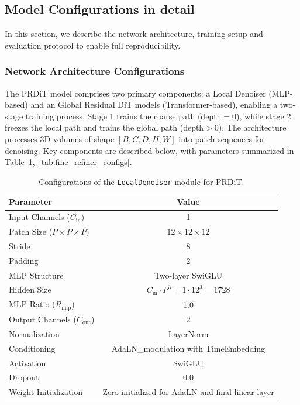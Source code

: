 \subsection{Model Configurations in detail}
\label{ap:mc}
In this section, we describe the network architecture, training setup and evaluation protocol to enable full reproducibility. 
\subsubsection{Network Architecture Configurations}
The PRDiT model comprises two primary components: a Local Denoiser (MLP-based) and an Global Residual DiT models (Transformer-based), enabling a two-stage training process. Stage 1 trains the coarse path (depth$=$0), while stage 2 freezes the local path and trains the global path (depth$>$0). The architecture processes 3D volumes of shape $[B, C, D, H, W]$ into patch sequences for denoising. Key components are described below, with parameters summarized in Table~\ref{tab:local_denoiser},~\ref{tab:fine_refiner_configs}.

\begin{table}[h]
    \centering
    \begin{tabular}{lc}
        \toprule
        Parameter & Value \\
        \midrule
        Input Channels ($C_{\text{in}}$) & 1 \\
        Patch Size ($P \times P \times P$) & $12 \times 12 \times 12$ \\
        Stride & 8 \\
        Padding & 2 \\
        MLP Structure & Two-layer SwiGLU \\
        Hidden Size & $C_{\text{in}} \cdot P^3 = 1 \cdot 12^3 = 1728$ \\
        MLP Ratio ($R_{\text{mlp}}$) & 1.0 \\
        Output Channels ($C_{\text{out}}$) & 2 \\
        Normalization & LayerNorm \\
        Conditioning & AdaLN\_modulation with TimeEmbedding \\
        Activation & SwiGLU \\
        Dropout & 0.0 \\
        Weight Initialization & Zero-initialized for AdaLN and final linear layer \\
        \bottomrule
    \end{tabular}
    \caption{Configurations of the \texttt{LocalDenoiser} module for PRDiT.}
    \label{tab:local_denoiser}
\end{table}

